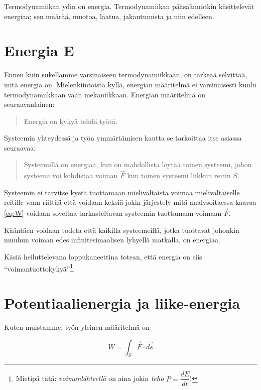 \documentclass[12pt,a4paper,finnish]{book}
\begin{document}
Termodynamiikan ydin on energia. Termodynamiikan pääsäännötkin käsittelevät energiaa; sen määrää, 
muotoa, laatua, jakautumista ja niin edelleen.

\section{Energia E} %

Ennen kuin sukellamme varsinaiseen termodynamiikkaan, on tärkeää selvittää, mitä energia on. Mielenkiintoista 
kyllä, energian määritelmä ei varsinaisesti kuulu termodynamiikkaan vaan mekaniikkaan. Energian määritelmä on 
seuraavanlainen:

\begin{quote}
 Energia on kykyä tehdä työtä.
\end{quote}

Systeemin yhteydessä ja työn ymmärtämisen kautta se tarkoittaa itse asiassa seuraavaa:

\begin{quotation}
 Systeemillä on energiaa, kun on mahdollista löytää toinen systeemi, johon systeemi voi kohdistaa 
 voiman $\vec{F}$ kun toinen systeemi liikkuu reitin $S$.
\end{quotation}

Systeemin ei tarvitse kyetä tuottamaan mielivaltaista voimaa mielivaltaiselle reitille vaan riittää että 
voidaan keksiä jokin järjestely mitä analysoitaessa kaavaa \ref{eq:W} voidaan soveltaa tarkasteltavan 
systeemin tuottamaan voimaan $\vec{F}$.

Kääntäen voidaan todeta että kaikilla systeemeillä, jotka tuottavat johonkin muuhun voiman edes 
infinitesimaalisen lyhyellä matkalla, on energiaa.

Käsiä heiluttelevana loppukaneettina totean, että energia on siis ``voimantuottokykyä''\footnote{
Mietipä tätä: \textit{voimanlähteellä} on aina jokin \textit{teho} $P = \dfrac{dE}{dt}$!}.

\section{Potentiaalienergia ja liike-energia} %

Kuten muistamme, työn yleinen määritelmä on

\begin{equation}
 W = \int_S \vec{F} \cdot \vec{ds}
\end{equation}
\end{document}
